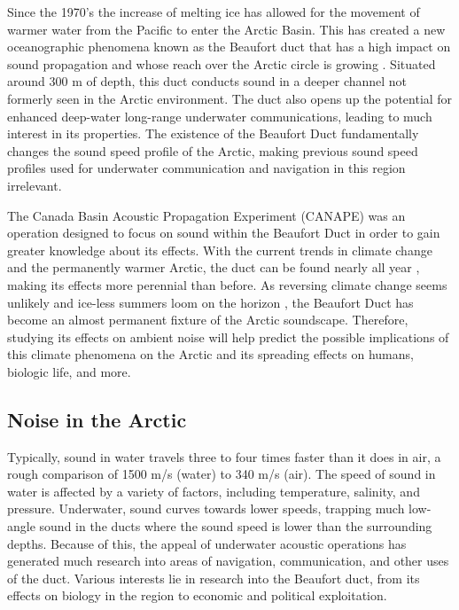 Since the 1970's the increase of melting ice has allowed for the movement of warmer water from the Pacific to enter the Arctic Basin. This has created a new oceanographic phenomena known as the Beaufort duct that has a high impact on sound propagation and whose reach over the Arctic circle is growing \parencite{toole2010influences}. Situated around 300 m of depth, this duct conducts sound in a deeper channel not formerly seen in the Arctic environment. The duct also opens up the potential for enhanced deep-water long-range underwater communications, leading to much interest in its properties. The existence of the Beaufort Duct fundamentally changes the sound speed profile of the Arctic, making previous sound speed profiles used for underwater communication and navigation in this region irrelevant. 

The Canada Basin Acoustic Propagation Experiment (CANAPE) was an operation designed to focus on sound within the Beaufort Duct in order to gain greater knowledge about its effects. With the current trends in climate change and the permanently warmer Arctic, the duct can be found nearly all year \parencite{duda2017acoustic}, making its effects more perennial than before. As reversing climate change seems unlikely and ice-less summers loom on the horizon \parencite{notz2020}, the Beaufort Duct has become an almost permanent fixture of the Arctic soundscape. Therefore, studying its effects on ambient noise will help predict the possible implications of this climate phenomena on the Arctic and its spreading effects on humans, biologic life, and more.


\subsection{Noise in the Arctic}    \label{intro_arctic_noise}

Typically, sound in water travels three to four times faster than it does in air, a rough comparison of 1500 m/s (water) to 340 m/s (air). The speed of sound in water is affected by a variety of factors, including temperature, salinity, and pressure. Underwater, sound curves towards lower speeds, trapping much low-angle sound in the ducts where the sound speed is lower than the surrounding depths. \parencite{chen2020tempo} Because of this, the appeal of underwater acoustic operations has generated much research into areas of navigation, communication, and other uses of the duct. Various interests lie in research into the Beaufort duct, from its effects on biology in the region to economic and political exploitation. 

